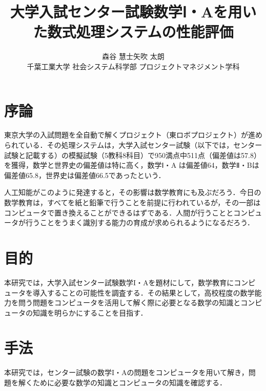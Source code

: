 \documentclass[uplatex,twocolumn]{jsarticle}
\title{\vspace{-10mm}\Large{大学入試センター試験数学Ⅰ・Aを用いた数式処理システムの性能評価}\footnotemark[0]}
\author{\large{森谷 慧士\footnotemark[2]\qquad 矢吹 太朗}\\千葉工業大学 社会システム科学部 プロジェクトマネジメント学科\footnotemark[3]}
\date{}
\begin{document}
\twocolumn[\maketitle]

\begingroup
\def\thefootnote{\fnsymbol{footnote}}
\endgroup



\section{序論}

東京大学の入試問題を全自動で解くプロジェクト（東ロボプロジェクト）が進められている\cite{arai2014}．その処理システムは，大学入試センター試験（以下では，センター試験と記載する）の模擬試験（5教科8科目）で950満点中511点（偏差値は57.8）を獲得，数学と世界史の偏差値は特に高く，数学Ⅰ・A は偏差値64，数学Ⅱ・Bは偏差値65.8，世界史は偏差値66.5であったという\cite{tourobo}．

人工知能がこのように発達すると，その影響は数学教育にも及ぶだろう．今日の数学教育は，すべてを紙と鉛筆で行うことを前提に行われているが，その一部はコンピュータで置き換えることができるはずである．人間が行うこととコンピュータが行うことをうまく識別する能力の育成が求められるようになるだろう．

\section{目的}

本研究では，大学入試センター試験数学I・Aを題材にして，数学教育にコンピュータを導入することの可能性を調査する．その結果として，高校程度の数学能力を問う問題をコンピュータを活用して解く際に必要となる数学の知識とコンピュータの知識を明らかにすることを目指す．





\section{手法}

本研究では，センター試験の数学I・Aの問題をコンピュータを用いて解き，問題を解くために必要な数学の知識とコンピュータの知識を確認する．
\end{document}

